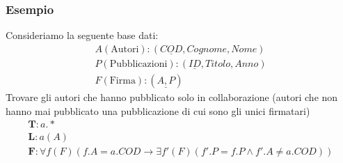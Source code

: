 \subsubsection{Esempio}
Consideriamo la seguente base dati:
    \begin{equation}\begin{aligned}
        A (\text{Autori}): (\underline{COD}, Cognome, Nome)\\
        P (\text{Pubblicazioni}): (\underline{ID}, Titolo, Anno)\\
        F (\text{Firma}): (\underline{A, P})
    \end{aligned}\end{equation}
Trovare gli autori che hanno pubblicato solo in collaborazione (autori che non hanno mai pubblicato una pubblicazione di cui sono gli unici firmatari)
    \begin{equation}\begin{aligned}
        \textbf{T}: a.*\\
        \textbf{L}: a(A)\\
        \textbf{F}: \forall f(F) (f.A = a.COD \rightarrow \exists f'(F) (f'.P = f.P \wedge f'.A \neq a.COD))
    \end{aligned}\end{equation}